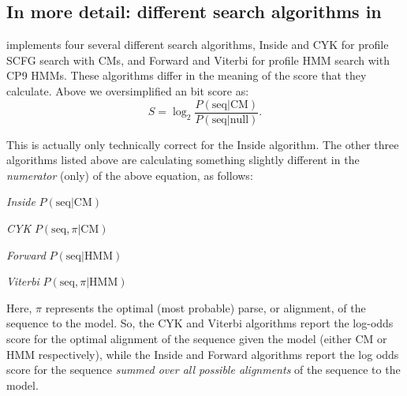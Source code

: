 \subsection{In more detail: different search algorithms in }
 implements four several different search 
algorithms, Inside and CYK for profile SCFG search with CMs, and
Forward and Viterbi for profile HMM search with CP9 HMMs.
These algorithms
differ in the meaning of the score that they calculate. Above we
oversimplified an  bit score as:
\[
	S = \log_2 \frac {P( \mbox{seq} | \mbox{CM})} { P (\mbox{seq} |
	\mbox{null})}.
\]

This is actually only technically correct for the Inside
algorithm. The other three algorithms listed above are calculating
something slightly different in the \emph{numerator} (only) of the
above equation, as follows: 

\begin{wideitem}
\item[\em{Inside}]  $P(\mbox{seq}      | \mbox{CM})$
\item[\em{CYK}]     $P(\mbox{seq},\pi  | \mbox{CM})$
\item[\em{Forward}] $P(\mbox{seq}      | \mbox{HMM})$
\item[\em{Viterbi}] $P(\mbox{seq},\pi  | \mbox{HMM})$
\end{wideitem}

Here, $\pi$ represents the optimal (most probable) parse, or
alignment, of the sequence to the model. So, the CYK and Viterbi
algorithms report the log-odds score for the optimal alignment 
of the sequence given the model (either CM or HMM respectively), while
the Inside and Forward algorithms report the log odds score for the
sequence \emph{summed over all possible alignments} of the sequence to
the model. 

